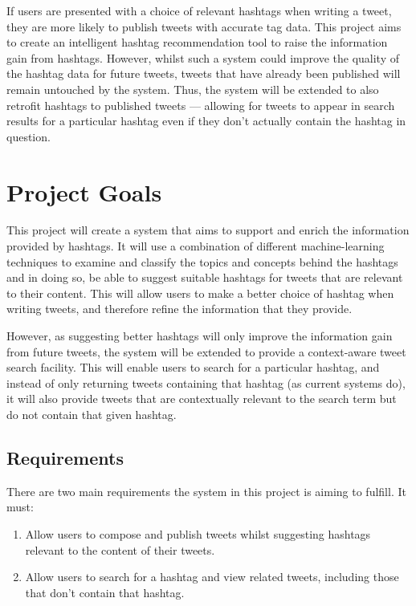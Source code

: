 \documentclass[12pt,a4paper]{article}
\begin{document}
If users are presented with a choice of relevant hashtags when writing a tweet, they are more likely to publish tweets with accurate tag data. This project aims to create an intelligent hashtag recommendation tool to raise the information gain from hashtags. However, whilst such a system could improve the quality of the hashtag data for future tweets, tweets that have already been published will remain untouched by the system. Thus, the system will be extended to also retrofit hashtags to published tweets --- allowing for tweets to appear in search results for a particular hashtag even if they don't actually contain the hashtag in question.
\pagebreak

\tableofcontents
\pagebreak

\section{Project Goals}
This project will create a system that aims to support and enrich the information provided by hashtags. It will use a combination of different machine-learning techniques to examine and classify the topics and concepts behind the hashtags and in doing so, be able to suggest suitable hashtags for tweets that are relevant to their content. This will allow users to make a better choice of hashtag when writing tweets, and therefore refine the information that they provide.

However, as suggesting better hashtags will only improve the information gain from future tweets, the system will be extended to provide a context-aware tweet search facility. This will enable users to search for a particular hashtag, and instead of only returning tweets containing that hashtag (as current systems do), it will also provide tweets that are contextually relevant to the search term but do not contain that given hashtag.

\subsection{Requirements}
There are two main requirements the system in this project is aiming to fulfill. It must:
\begin{enumerate}
    \item Allow users to compose and publish tweets whilst suggesting hashtags relevant to the content of their tweets.
    \item Allow users to search for a hashtag and view related tweets, including those that don't contain that hashtag.
\end{enumerate}
\end{document}
